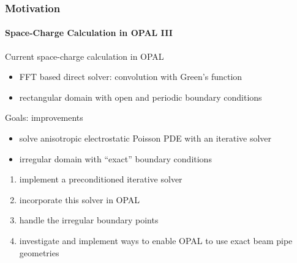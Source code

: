 \documentclass[xcolor=pdftex,table,10pt]{beamer}
\newcommand{\opal}{\textsc{OPAL }}
\begin{document}
	\begin{frame}
		\frametitle{Motivation}
		\framesubtitle{Space-Charge Calculation in \opal III}

		\begin{exampleblock}{Current space-charge calculation in \opal}
		\begin{itemize}
			\item FFT based direct solver: convolution with Green's function
			\item rectangular domain with open and periodic boundary conditions
		\end{itemize}
		\end{exampleblock}

		\pause
		\vspace{0.2cm}

		\begin{alertblock}{Goals: improvements}
		\begin{itemize}
			\item solve anisotropic electrostatic Poisson PDE with an iterative solver
			\item irregular domain with ``exact'' boundary conditions
		\end{itemize}
		\end{alertblock}

		\pause
		
		\begin{enumerate}
			\item implement a preconditioned iterative solver
			\item incorporate this solver in \opal
			\item handle the irregular boundary points
			\item investigate and implement ways to enable \opal to use exact beam pipe geometries
		\end{enumerate}

	\end{frame}
	
%
%
%
%
\end{document}
